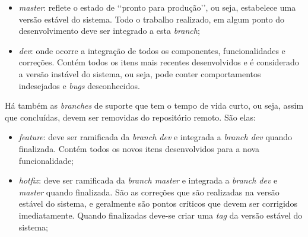 \begin{itemize}
  \item \textit{master}: reflete o estado de \lq\lq pronto para produção\rq\rq,
    ou seja, estabelece uma versão estável do sistema. Todo
    o trabalho realizado, em algum ponto do desenvolvimento
    deve ser integrado a esta \textit{branch};
  \item \textit{dev}: onde ocorre a integração de todos os componentes,
    funcionalidades e correções. Contém todos os itens mais
    recentes desenvolvidos e é considerado a versão instável
    do sistema, ou seja, pode conter comportamentos indesejados
    e \textit{bugs} desconhecidos.
\end{itemize}

Há também as \textit{branches} de suporte que tem o tempo de vida curto, ou seja,
assim que concluídas, devem ser removidas do repositório remoto. São
elas:

\begin{itemize}
  \item \textit{feature}: deve ser ramificada da \textit{branch dev} e
    integrada a \textit{branch dev} quando finalizada. Contém todos os
    novos itens desenvolvidos para a nova funcionalidade;
  \item \textit{hotfix}: deve ser ramificada da \textit{branch master} e
    integrada a \textit{branch dev} e \textit{master} quando finalizada. São
    as correções que são realizadas na versão estável do sistema, e geralmente
    são pontos críticos que devem ser corrigidos imediatamente. Quando finalizadas
    deve-se criar uma \textit{tag} da versão estável do sistema;
\end{itemize}
